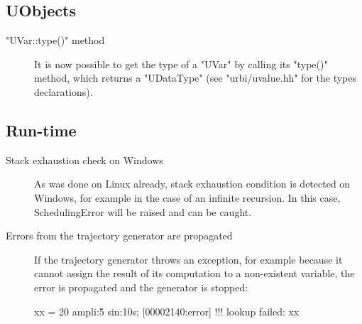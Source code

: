 \subsection{UObjects}
\begin{description}
\item["UVar::type()" method]

It is now possible to get the type of a "UVar" by calling its "type()"
method, which returns a "UDataType" (see "urbi/uvalue.hh" for the
types declarations).
\end{description}

\subsection{Run-time}
\begin{description}
\item[Stack exhaustion check on Windows]

As was done on Linux already, stack exhaustion condition is detected
on Windows, for example in the case of an infinite recursion. In this
case, SchedulingError will be raised and can be caught.

\item[Errors from the trajectory generator are propagated]

If the trajectory generator throws an exception, for example because it
cannot assign the result of its computation to a non-existent variable,
the error is propagated and the generator is stopped:

\begin{urbiscript}
xx = 20 ampli:5 sin:10s;
[00002140:error] !!! lookup failed: xx
\end{urbiscript}
\end{description}

